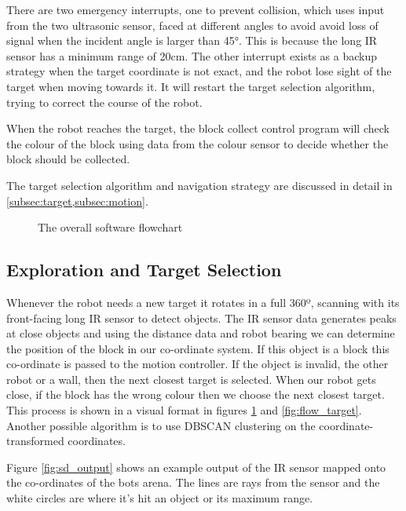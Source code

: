 There are two emergency interrupts, one to prevent collision, which uses input from the two ultrasonic sensor, faced at different angles to avoid avoid loss of signal when the incident angle is larger than 45\si{\degree}. This is because the long IR sensor has a minimum range of 20\si{cm}. The other interrupt exists as a backup strategy when the target coordinate is not exact, and the robot lose sight of the target when moving towards it. It will restart the target selection algorithm, trying to correct the course of the robot.

When the robot reaches the target, the block collect control program will check the colour of the block using data from the colour sensor to decide whether the block should be collected.

The target selection algorithm and navigation strategy are discussed in detail in \cref{subsec:target,subsec:motion}.

\newpage
\begin{figure}[H]
    \centering
    
    \caption{The overall software flowchart}
    \label{fig:flow_overall}
\end{figure}
\newpage

\subsection{Exploration and Target Selection}\label{subsec:target}

Whenever the robot needs a new target it rotates in a full 360º, scanning with its front-facing long IR sensor to detect objects. The IR sensor data generates peaks at close objects and using the distance data and robot bearing we can determine the position of the block in our co-ordinate system. If this object is a block this co-ordinate is passed to the motion controller. If the object is invalid, the other robot or a wall, then the next closest target is selected. When our robot gets close, if the block has the wrong colour then we choose the next closest target. This process is shown in a visual format in figures \ref{fig:flow_overall} and \ref{fig:flow_target}. Another possible algorithm is to use DBSCAN clustering on the coordinate-transformed coordinates.

Figure \ref{fig:sd_output} shows an example output of the IR sensor mapped onto the co-ordinates of the bots arena. The lines are rays from the sensor and the white circles are where it's hit an object or its maximum range.

